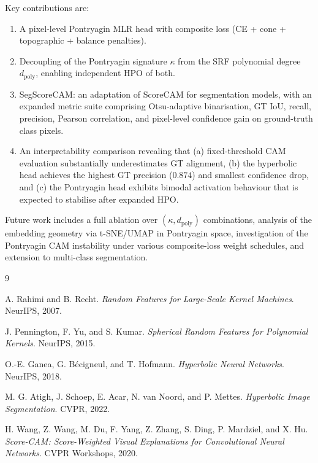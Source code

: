 \documentclass[12pt,a4paper]{article}
\newcommand{\kap}{\kappa}
\newcommand{\dpoly}{d_{\mathrm{poly}}}
\theoremstyle{definition}
\begin{document}
Key contributions are:
\begin{enumerate}[noitemsep]
  \item A pixel-level Pontryagin MLR head with composite loss (CE + cone +
        topographic + balance penalties).
  \item Decoupling of the Pontryagin signature $\kap$ from the SRF polynomial
        degree $\dpoly$, enabling independent HPO of both.
  \item SegScoreCAM: an adaptation of ScoreCAM for segmentation models,
        with an expanded metric suite comprising Otsu-adaptive binarisation,
        GT IoU, recall, precision, Pearson correlation, and pixel-level
        confidence gain on ground-truth class pixels.
  \item An interpretability comparison revealing that (a) fixed-threshold CAM
        evaluation substantially underestimates GT alignment, (b) the
        hyperbolic head achieves the highest GT precision ($0.874$) and
        smallest confidence drop, and (c) the Pontryagin head exhibits bimodal
        activation behaviour that is expected to stabilise after expanded HPO.
\end{enumerate}

Future work includes a full ablation over $(\kap, \dpoly)$ combinations,
analysis of the embedding geometry via t-SNE/UMAP in Pontryagin space,
investigation of the Pontryagin CAM instability under various composite-loss
weight schedules, and extension to multi-class segmentation.


\begin{thebibliography}{9}

A. Rahimi and B. Recht.
\textit{Random Features for Large-Scale Kernel Machines}.
NeurIPS, 2007.

J. Pennington, F. Yu, and S. Kumar.
\textit{Spherical Random Features for Polynomial Kernels}.
NeurIPS, 2015.

O.-E. Ganea, G. Bécigneul, and T. Hofmann.
\textit{Hyperbolic Neural Networks}.
NeurIPS, 2018.

M. G. Atigh, J. Schoep, E. Acar, N. van Noord, and P. Mettes.
\textit{Hyperbolic Image Segmentation}.
CVPR, 2022.

H. Wang, Z. Wang, M. Du, F. Yang, Z. Zhang, S. Ding, P. Mardziel, and X. Hu.
\textit{Score-CAM: Score-Weighted Visual Explanations for Convolutional Neural Networks}.
CVPR Workshops, 2020.

\end{thebibliography}
\end{document}
